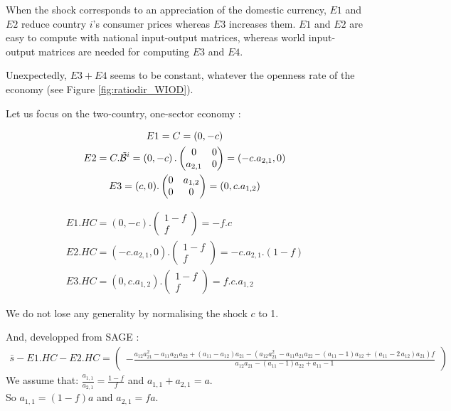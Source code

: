 \documentclass[11pt,a4paper]{article}
\begin{document}
\begin{appendices}
When the shock corresponds to an appreciation of the domestic currency, $E1$ and $E2$ reduce country $i$'s consumer prices whereas $E3$ increases them. $E1$ and $E2$ are easy to compute with national input-output matrices, whereas world input-output matrices are needed for computing $E3$ and $E4$.

Unexpectedly, $E3 + E4$ seems to be constant, whatever the openness rate of the economy (see Figure \ref{fig:ratiodir_WIOD}).


Let us focus on the two-country, one-sector economy : 

\begin{gather*}
E1=C=\left(0,-c\right)
\\
E2=C.\tilde{\cal B}^i=\left(0,-c\right).\left(\begin{matrix}0&0\\a_{2,1}&0\end{matrix}\right)=\left(-c.a_{2,1},0\right)
\\
E3=(c,0).\left(\begin{matrix}0&a_{1,2}\\0&0\end{matrix}\right)=\left(0,c.a_{1,2}\right)
\end{gather*}

\begin{gather*}
E1.HC = \left(0,-c\right).\left(\begin{matrix}1-f\\f\end{matrix}\right)=-f.c
\\
E2.HC=\left(-c.a_{2,1},0\right).\left(\begin{matrix}1-f\\f\end{matrix}\right)=-c.a_{2,1}.\left(1-f\right)
\\ 
E3.HC=\left(0,c.a_{1,2}\right).\left(\begin{matrix}1-f\\f\end{matrix}\right)=f.c.a_{1,2}
\end{gather*}

We do not lose any generality by normalising the shock $c$ to 1. 

And, developped from SAGE :
\begin{gather}
\bar{s}-E1.HC-E2.HC=\left(\begin{array}{r}
-\frac{a_{12} a_{21}^{2} - a_{11} a_{21} a_{22} + {\left(a_{11} - a_{12}\right)} a_{21} - {\left(a_{12} a_{21}^{2} - a_{11} a_{21} a_{22} - {\left(a_{11} - 1\right)} a_{12} + {\left(a_{11} - 2 \, a_{12}\right)} a_{21}\right)} f}{a_{12} a_{21} - {\left(a_{11} - 1\right)} a_{22} + a_{11} - 1}
\end{array}\right)
\end{gather}
We assume that:
$\frac{a_{1,1}}{a_{2,1}}=\frac{1-f}{f}$ and $a_{1,1}+a_{2,1}=a$. \\ 
So
$a_{1,1}=(1-f)a$ and $a_{2,1}=fa$. \\


\end{appendices}
\end{document}
